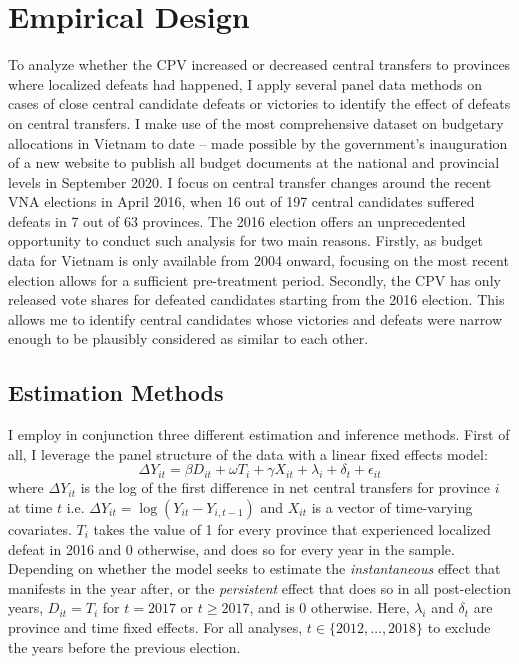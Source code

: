 \documentclass[12pt]{article}
\newcommand\fnote[1]{\footnote{\baselineskip=2\normalbaselineskip#1}}
\newcommand{\1}{\mathbbm{1}}
\let\footnote=\endnote
\begin{document}
\section*{Empirical Design}
\label{sec:methods}

To analyze whether the CPV increased or decreased central transfers to provinces where localized defeats had happened, I apply several panel data methods on cases of close central candidate defeats or victories to identify the effect of defeats on central transfers. I make use of the most comprehensive dataset on budgetary allocations in Vietnam to date -- made possible by the government's inauguration of a new website to publish all budget documents at the national and provincial levels in September 2020. I focus on central transfer changes around the recent VNA elections in April 2016, when 16 out of 197 central candidates suffered defeats in 7 out of 63 provinces. The 2016 election offers an unprecedented opportunity to conduct such analysis for two main reasons. Firstly, as budget data for Vietnam is only available from 2004 onward, focusing on the most recent election allows for a sufficient pre-treatment period. Secondly, the CPV has only released vote shares for defeated candidates starting from the 2016 election. This allows me to identify central candidates whose victories and defeats were narrow enough to be plausibly considered as similar to each other.

\subsection*{Estimation Methods}
\label{sec:methods_estimation}
I employ in conjunction three different estimation and inference methods. First of all, I leverage the panel structure of the data with a linear fixed effects model:
\begin{equation}
\Delta Y_{it} = \beta D_{it} + \omega T_{i} + \gamma X_{it} + \lambda_i + \delta_t + \epsilon_{it} \label{eq:FE}
\end{equation}
where $\Delta Y_{it}$ is the log of the first difference in net central transfers for province $i$ at time $t$ i.e. $\Delta Y_{it} = \log(Y_{it} - Y_{i, t-1})$ and $X_{it}$ is a vector of time-varying covariates. $T_{i}$ takes the value of 1 for every province that experienced localized defeat in 2016 and 0 otherwise, and does so for every year in the sample. Depending on whether the model seeks to estimate the \textit{instantaneous} effect that manifests in the year after, or the \textit{persistent} effect that does so in all post-election years, $D_{it} = T_{i}$ for $t=2017$ or $t\geq2017$, and is  $0$ otherwise. %
Here, $\lambda_i$ and $\delta_t$ are province and time fixed effects. For all analyses, $t \in \{2012, \ldots, 2018\}$ to exclude the years before the previous election.
\end{document}
